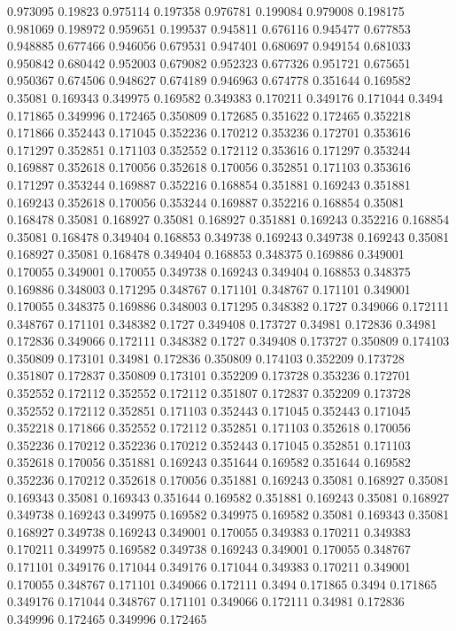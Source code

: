 0.973095 0.19823
0.975114 0.197358
0.976781 0.199084
0.979008 0.198175
0.981069 0.198972
0.959651 0.199537
0.945811 0.676116
0.945477 0.677853
0.948885 0.677466
0.946056 0.679531
0.947401 0.680697
0.949154 0.681033
0.950842 0.680442
0.952003 0.679082
0.952323 0.677326
0.951721 0.675651
0.950367 0.674506
0.948627 0.674189
0.946963 0.674778
0.351644 0.169582
0.35081 0.169343
0.349975 0.169582
0.349383 0.170211
0.349176 0.171044
0.3494 0.171865
0.349996 0.172465
0.350809 0.172685
0.351622 0.172465
0.352218 0.171866
0.352443 0.171045
0.352236 0.170212
0.353236 0.172701
0.353616 0.171297
0.352851 0.171103
0.352552 0.172112
0.353616 0.171297
0.353244 0.169887
0.352618 0.170056
0.352618 0.170056
0.352851 0.171103
0.353616 0.171297
0.353244 0.169887
0.352216 0.168854
0.351881 0.169243
0.351881 0.169243
0.352618 0.170056
0.353244 0.169887
0.352216 0.168854
0.35081 0.168478
0.35081 0.168927
0.35081 0.168927
0.351881 0.169243
0.352216 0.168854
0.35081 0.168478
0.349404 0.168853
0.349738 0.169243
0.349738 0.169243
0.35081 0.168927
0.35081 0.168478
0.349404 0.168853
0.348375 0.169886
0.349001 0.170055
0.349001 0.170055
0.349738 0.169243
0.349404 0.168853
0.348375 0.169886
0.348003 0.171295
0.348767 0.171101
0.348767 0.171101
0.349001 0.170055
0.348375 0.169886
0.348003 0.171295
0.348382 0.1727
0.349066 0.172111
0.348767 0.171101
0.348382 0.1727
0.349408 0.173727
0.34981 0.172836
0.34981 0.172836
0.349066 0.172111
0.348382 0.1727
0.349408 0.173727
0.350809 0.174103
0.350809 0.173101
0.34981 0.172836
0.350809 0.174103
0.352209 0.173728
0.351807 0.172837
0.350809 0.173101
0.352209 0.173728
0.353236 0.172701
0.352552 0.172112
0.352552 0.172112
0.351807 0.172837
0.352209 0.173728
0.352552 0.172112
0.352851 0.171103
0.352443 0.171045
0.352443 0.171045
0.352218 0.171866
0.352552 0.172112
0.352851 0.171103
0.352618 0.170056
0.352236 0.170212
0.352236 0.170212
0.352443 0.171045
0.352851 0.171103
0.352618 0.170056
0.351881 0.169243
0.351644 0.169582
0.351644 0.169582
0.352236 0.170212
0.352618 0.170056
0.351881 0.169243
0.35081 0.168927
0.35081 0.169343
0.35081 0.169343
0.351644 0.169582
0.351881 0.169243
0.35081 0.168927
0.349738 0.169243
0.349975 0.169582
0.349975 0.169582
0.35081 0.169343
0.35081 0.168927
0.349738 0.169243
0.349001 0.170055
0.349383 0.170211
0.349383 0.170211
0.349975 0.169582
0.349738 0.169243
0.349001 0.170055
0.348767 0.171101
0.349176 0.171044
0.349176 0.171044
0.349383 0.170211
0.349001 0.170055
0.348767 0.171101
0.349066 0.172111
0.3494 0.171865
0.3494 0.171865
0.349176 0.171044
0.348767 0.171101
0.349066 0.172111
0.34981 0.172836
0.349996 0.172465
0.349996 0.172465
